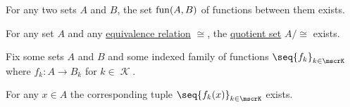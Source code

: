 \begin{proposition}
\begin{thmenum}
     For any two sets \( A \) and \( B \), the set \hyperref[def:function/set_of_functions]{\( \operatorname{fun}(A, B) \)} of functions between them exists.

     For any set \( A \) and any \hyperref[def:equivalence_relation]{equivalence relation} \( \cong \), the \hyperref[def:equivalence_relation/quotient]{quotient set} \( A / {\cong} \) exists.

     Fix some sets \( A \) and \( B \) and some indexed family of functions \( \seq{ f_k }_{k \in \mscrK} \) where \( f_k: A \to B_k \) for \( k \in \mscrK \).

    For any \( x \in A \) the corresponding tuple \( \seq{ f_k(x) }_{k \in \mscrK} \) exists.
  \end{thmenum}
\end{proposition}

